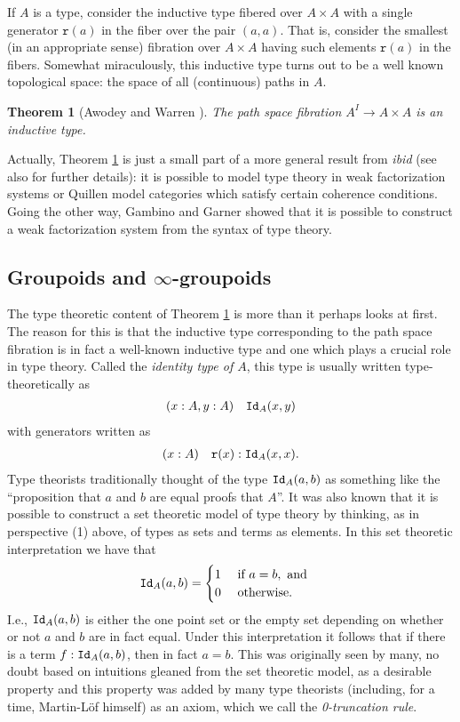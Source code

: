 \documentclass{amsart}
\newcommand{\id}[1]{\textnormal{\texttt{Id}}_{#1}}
\newcommand{\rr}{\mathtt{r}}
\newcommand{\judge}[2]{(#1)\quad #2}
\newtheorem{theorem}{Theorem}[section]
\theoremstyle{definition}
\theoremstyle{remark}
\numberwithin{equation}{section}
\begin{document}
If $A$ is a type, consider the inductive type fibered over $A\times A$
with a single generator $\rr(a)$ in the fiber over the pair $(a,a)$.
That is, consider the smallest (in an appropriate sense) fibration
over $A\times A$ having such elements $\rr(a)$ in the fibers.
Somewhat miraculously, this inductive type turns out to be a well
known topological space: the space of all (continuous) paths in $A$.
\begin{theorem}[Awodey and Warren \cite{Awodey:2009bz}]\label{theorem:aw}
  The path space fibration $A^{I}\to A\times A$ is an inductive
  type.
\end{theorem}
Actually, Theorem \ref{theorem:aw} is just a small part of a more
general result from \emph{ibid} (see also \cite{Warren:2008ts} for
further details): it is possible to model type theory in
weak factorization systems or Quillen model categories
\cite{Quillen:1967uz} which satisfy certain coherence conditions.
Going the other way, Gambino and Garner \cite{Gambino:2008bg} showed
that it is possible to construct a weak factorization system from the
syntax of type theory.

\subsection{Groupoids and $\infty$-groupoids}\label{sec:groupoids}

The type theoretic content of Theorem \ref{theorem:aw} is more than it
perhaps looks at first.  The reason for this is that the inductive
type corresponding to the path space fibration is in fact a well-known
inductive type and one which plays a crucial role in type theory.  Called the
\emph{identity type of $A$}, this type is usually written
type-theoretically as 
\begin{align*}
  \judge{x:A,y:A}{\id{A}(x,y)}
\end{align*}
with generators written as
\begin{align*}
  \judge{x:A}{\rr(x):\id{A}(x,x)}.
\end{align*}
Type theorists traditionally thought of the type $\id{A}(a,b)$ as
something like the ``proposition that $a$ and $b$ are equal proofs
that $A$''.  It was also known that it is possible to
construct a set theoretic model of type theory by thinking, as in
perspective (1) above, of types as sets and terms as elements.  In
this set theoretic interpretation we have that
\begin{align*}
  \id{A}(a,b) & =
  \begin{cases}
    1 & \text{ if }a=b,\text{ and}\\
    0 & \text{ otherwise.}
  \end{cases}
\end{align*}
I.e., $\id{A}(a,b)$ is either the one point set or the empty set
depending on whether or not $a$ and $b$ are in fact equal.  Under this
interpretation it follows that if there is a term $f:\id{A}(a,b)$,
then in fact $a=b$.  This was originally seen by many, no doubt based
on intuitions gleaned from the set theoretic model, as a desirable
property and this property was added by many type theorists (including, for a time,
Martin-L\"{o}f himself) as an axiom, which we call the
\emph{0-truncation rule}.  
\end{document}
